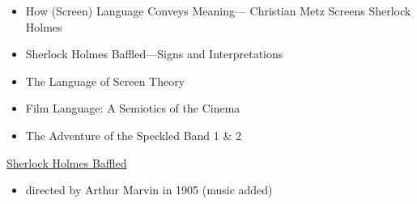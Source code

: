 \documentclass[a4paper,landscape,headrule,footrule,xetex]{foils}
\begin{document}
\makexeCJKinactive
\renewcommand{\avmvalfont}{\it}
\maketitle


\begin{itemize}
\item How (Screen) Language
Conveys Meaning—
Christian Metz Screens
Sherlock Holmes
\item 
Sherlock Holmes Baffled—Signs and
Interpretations
\item 
The Language of Screen Theory
\item Film Language: A Semiotics of the Cinema
\item The Adventure of the Speckled Band 1 \& 2
\end{itemize}

\href{https://www.youtube.com/watch?v=HYN4QzX9-EM}{Sherlock Holmes Baffled}

\begin{itemize} 
\item directed by Arthur Marvin in 1905 (music added)
\end{itemize}

\end{document}
